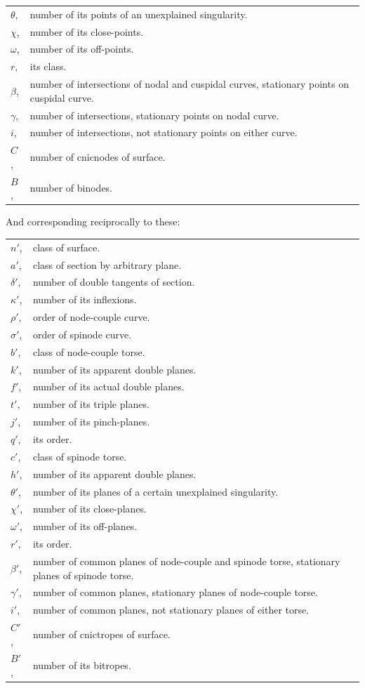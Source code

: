 \documentclass[11pt,a4paper]{article}
\theoremstyle{plain}
\theoremstyle{definition}
\theoremstyle{remark}
\begin{document}
\begin{tabular}{@{}l@{\ }l}
$\theta$, & number of its points of an unexplained singularity. \\
$\chi$, & number of its close-points. \\
$\omega$, & number of its off-points. \\
$r$, & its class. \\
$\beta$, & number of intersections of nodal and cuspidal curves, stationary points on cuspidal curve. \\
$\gamma$, & number of intersections, stationary points on nodal curve. \\
$i$, & number of intersections, not stationary points on either curve. \\
$C$, & number of cnicnodes of surface. \\
$B$, & number of binodes.
\end{tabular}

\smallskip

And corresponding reciprocally to these:

\smallskip
\noindent
\begin{tabular}{@{}l@{\ }l}
$n'$, & class of surface. \\
$a'$, & class of section by arbitrary plane. \\
$\delta'$, & number of double tangents of section. \\
$\kappa'$, & number of its inflexions. \\
$\rho'$, & order of node-couple curve. \\
$\sigma'$, & order of spinode curve. \\
$b'$, & class of node-couple torse. \\
$k'$, & number of its apparent double planes. \\
$f'$, & number of its actual double planes. \\
$t'$, & number of its triple planes. \\
$j'$, & number of its pinch-planes. \\
$q'$, & its order. \\
$c'$, & class of spinode torse. \\
$h'$, & number of its apparent double planes. \\
$\theta'$, & number of its planes of a certain unexplained singularity. \\
$\chi'$, & number of its close-planes. \\
$\omega'$, & number of its off-planes. \\
$r'$, & its order. \\
$\beta'$, & number of common planes of node-couple and spinode torse, stationary planes of spinode torse. \\
$\gamma'$, & number of common planes, stationary planes of node-couple torse. \\
$i'$, & number of common planes, not stationary planes of either torse. \\
$C'$, & number of cnictropes of surface. \\
$B'$, & number of its bitropes.
\end{tabular}
\end{document}
